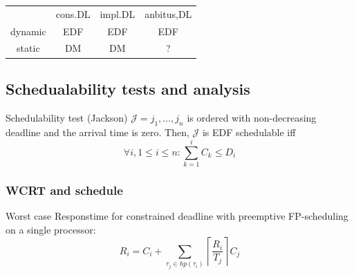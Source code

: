 \begin{center}
\begin{tabular}{ |c|c|c|c| } 
 \hline
  & cons.DL & impl.DL & anbitus,DL \\ 
 dynamic & EDF \color{pink}{dbf} & EDF \color{pink}{$U \leq 1$} & EDF \color{pink}{dbf} \\ 
 static & DM & DM & ? \\ 
 \hline
\end{tabular}
\end{center}

   
\subsection{Schedualability tests and analysis}

\begin{definitionblock}{Schedulability test (Jackson)}
   $\mathcal{J} = {j_1,\ldots,j_n}$ is ordered with non-decreasing deadline and the arrival time is zero. Then, $\mathcal{J}$ is EDF schedulable iff
  \begin{equation*}
    \forall i, 1\leq i\leq n: \sum_{k=1}^{i} C_k\leq D_i
  \end{equation*}
\end{definitionblock}


\subsubsection{WCRT and schedule}
Worst case Responstime for constrained deadline with preemptive FP-scheduling on a single processor:
\begin{equation}
  R_i = C_i + \sum_{\tau_j \in hp(\tau_i)} \left\lceil\frac{R_i}{T_j}\right\rceil C_j
\end{equation}

